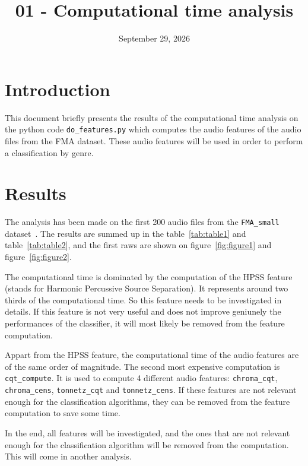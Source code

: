 \documentclass[11pt]{article}
\title{01 - Computational time analysis}
\author{}
\date{September 29, 2026}
\begin{document}
\maketitle

\section{Introduction}

This document briefly presents the results of the computational time analysis on the python code \texttt{do\_features.py} which computes the audio features of the audio files from the FMA dataset. These audio features will be used in order to perform a classification by genre.

\section{Results}

The analysis has been made on the first 200 audio files from the \texttt{FMA\_small} dataset~\cite{fma_dataset}. The results are summed up in the table~\ref{tab:table1} and table~\ref{tab:table2}, and the first raws are shown on figure~\ref{fig:figure1} and figure~\ref{fig:figure2}.

The computational time is dominated by the computation of the HPSS feature (stands for Harmonic Percussive Source Separation). It represents around two thirds of the computational time. So this feature needs to be investigated in details. If this feature is not very useful and does not improve geniunely the performances of the classifier, it will most likely be removed from the feature computation.

Appart from the HPSS feature, the computational time of the audio features are of the same order of magnitude. The second most expensive computation is \texttt{cqt\_compute}. It is used to compute 4 different audio features: \texttt{chroma\_cqt}, \texttt{chroma\_cens}, \texttt{tonnetz\_cqt} and \texttt{tonnetz\_cens}. If these features are not relevant enough for the classification algorithms, they can be removed from the feature computation to save some time.

In the end, all features will be investigated, and the ones that are not relevant enough for the classification algorithm will be removed from the computation. This will come in another analysis.
\end{document}
